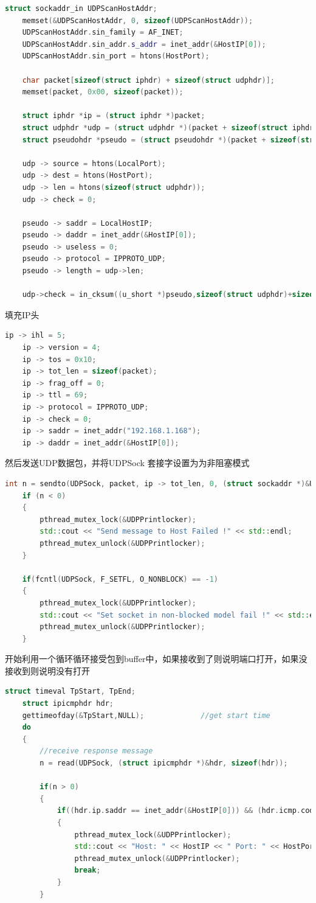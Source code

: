 \documentclass[UTF8,a4paper,10pt]{ctexart}
\begin{document}
\begin{lstlisting}[language = C++]
    struct sockaddr_in UDPScanHostAddr; 
    memset(&UDPScanHostAddr, 0, sizeof(UDPScanHostAddr));
	UDPScanHostAddr.sin_family = AF_INET;
	UDPScanHostAddr.sin_addr.s_addr = inet_addr(&HostIP[0]);
	UDPScanHostAddr.sin_port = htons(HostPort); 

    char packet[sizeof(struct iphdr) + sizeof(struct udphdr)]; 
    memset(packet, 0x00, sizeof(packet)); 

	struct iphdr *ip = (struct iphdr *)packet; 
    struct udphdr *udp = (struct udphdr *)(packet + sizeof(struct iphdr)); 
    struct pseudohdr *pseudo = (struct pseudohdr *)(packet + sizeof(struct iphdr) - sizeof(struct pseudohdr)); 

    udp -> source = htons(LocalPort);                 
    udp -> dest = htons(HostPort);           
    udp -> len = htons(sizeof(struct udphdr));
    udp -> check = 0;  

	pseudo -> saddr = LocalHostIP; 
    pseudo -> daddr = inet_addr(&HostIP[0]); 
    pseudo -> useless = 0; 
    pseudo -> protocol = IPPROTO_UDP; 
    pseudo -> length = udp->len; 

    udp->check = in_cksum((u_short *)pseudo,sizeof(struct udphdr)+sizeof(struct pseudohdr));
\end{lstlisting}
填充IP头
\begin{lstlisting}[language = C++]
    ip -> ihl = 5; 
	ip -> version = 4; 
	ip -> tos = 0x10; 
	ip -> tot_len = sizeof(packet); 
	ip -> frag_off = 0; 
	ip -> ttl = 69; 
	ip -> protocol = IPPROTO_UDP; 
	ip -> check = 0; 
	ip -> saddr = inet_addr("192.168.1.168"); 
	ip -> daddr = inet_addr(&HostIP[0]);
\end{lstlisting}
然后发送UDP数据包，并将UDPSock 套接字设置为为非阻塞模式
\begin{lstlisting}[language = C++]
    int n = sendto(UDPSock, packet, ip -> tot_len, 0, (struct sockaddr *)&UDPScanHostAddr, sizeof(UDPScanHostAddr)); 
	if (n < 0) 
	{
		pthread_mutex_lock(&UDPPrintlocker);
		std::cout << "Send message to Host Failed !" << std::endl;
		pthread_mutex_unlock(&UDPPrintlocker);
	}

	if(fcntl(UDPSock, F_SETFL, O_NONBLOCK) == -1) 
	{
		pthread_mutex_lock(&UDPPrintlocker);
        std::cout << "Set socket in non-blocked model fail !" << std::endl;
		pthread_mutex_unlock(&UDPPrintlocker);
	}
\end{lstlisting}
开始利用一个循环循环接受包到buffer中，如果接收到了则说明端口打开，如果没接收到则说明没有打开
\begin{lstlisting}[language = C++]
    struct timeval TpStart, TpEnd; 
    struct ipicmphdr hdr;
    gettimeofday(&TpStart,NULL);             //get start time
	do 
	{
		//receive response message
        n = read(UDPSock, (struct ipicmphdr *)&hdr, sizeof(hdr));

        if(n > 0)
		{
			if((hdr.ip.saddr == inet_addr(&HostIP[0])) && (hdr.icmp.code == 3) && (hdr.icmp.type == 3))
			{
				pthread_mutex_lock(&UDPPrintlocker);
				std::cout << "Host: " << HostIP << " Port: " << HostPort << " closed !" << std::endl;
				pthread_mutex_unlock(&UDPPrintlocker);
				break;
			}
		}
\end{lstlisting}
\end{document}

